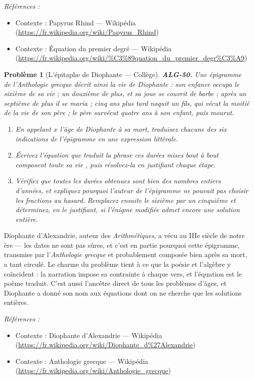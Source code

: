 \documentclass[11pt]{article}
\newtheorem{problem}{Problème}
\newenvironment{refs}{\par\small\noindent\emph{Références :}\begin{itemize}\setlength\itemsep{0pt}}{\end{itemize}\normalsize}
\begin{document}
\begin{refs}
\item Contexte : Papyrus Rhind --- Wikipédia (\url{https://fr.wikipedia.org/wiki/Papyrus_Rhind})
\item Contexte : Équation du premier degré --- Wikipédia (\url{https://fr.wikipedia.org/wiki/%C3%89quation_du_premier_degr%C3%A9})
\end{refs}

\bigskip

\begin{problem}[{L'épitaphe de Diophante --- Collège}]
\textbf{ALG-50.} Une épigramme de l'\textit{Anthologie grecque} décrit ainsi la vie de Diophante :
son enfance occupa le sixième de sa vie ; un douzième de plus, et sa joue se couvrit de barbe ;
après un septième de plus il se maria ; cinq ans plus tard naquit un fils, qui vécut la moitié de
la vie de son père ; le père survécut quatre ans à son enfant, puis mourut.
\begin{enumerate}
\item[(a)] En appelant $ x $ l'âge de Diophante à sa mort, traduisez chacune des six indications de
l'épigramme en une expression littérale.
\item[(b)] Écrivez l'équation que traduit la phrase \og{} ces durées mises bout à bout composent toute sa
vie \fg{}, puis résolvez-la en justifiant chaque étape.
\item[(c)] Vérifiez que toutes les durées obtenues sont bien des nombres entiers d'années, et expliquez
pourquoi l'auteur de l'épigramme ne pouvait pas choisir les fractions au hasard. Remplacez ensuite
le sixième par un cinquième et déterminez, en le justifiant, si l'énigme modifiée admet encore une
solution entière.
\end{enumerate}

\end{problem}

\noindent Diophante d'Alexandrie, auteur des \textit{Arithmétiques}, a vécu au
IIIe siècle de notre ère --- les dates ne sont pas sûres, et c'est en partie pourquoi
cette épigramme, transmise par l'\textit{Anthologie grecque} et probablement composée bien après sa
mort, a tant circulé. Le charme du problème tient à ce que la poésie et l'algèbre y coïncident : la
narration impose sa contrainte à chaque vers, et l'équation est le poème traduit. C'est aussi
l'ancêtre direct de tous les problèmes d'âges, et Diophante a donné son nom aux équations dont on
ne cherche que les solutions entières.

\begin{refs}
\item Contexte : Diophante d'Alexandrie --- Wikipédia (\url{https://fr.wikipedia.org/wiki/Diophante_d%27Alexandrie})
\item Contexte : Anthologie grecque --- Wikipédia (\url{https://fr.wikipedia.org/wiki/Anthologie_grecque})
\end{refs}
\end{document}
